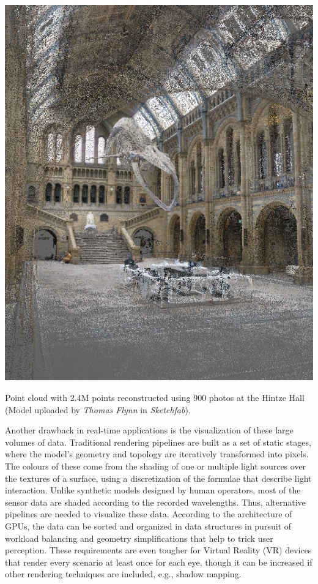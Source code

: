 \begin{marginfigure}[.5cm]
	\includegraphics{figs/introduction/hintze.png}
	\caption{Point cloud with 2.4M points reconstructed using 900 photos at the Hintze Hall (Model uploaded by \textit{Thomas Flynn} in \textit{Sketchfab}).  }
	\label{fig:hintze_hall}
\end{marginfigure}
Another drawback in real-time applications is the visualization of these large volumes of data. Traditional rendering pipelines are built as a set of static stages, where the model's geometry and topology are iteratively transformed into pixels. The colours of these come from the shading of one or multiple light sources over the textures of a surface, using a discretization of the formulae that describe light interaction. Unlike synthetic models designed by human operators, most of the sensor data are shaded according to the recorded wavelengths. Thus, alternative pipelines are needed to visualize these data. According to the architecture of GPUs, the data can be sorted and organized in data structures in pursuit of workload balancing and geometry simplifications that help to trick user perception. These requirements are even tougher for Virtual Reality (VR) devices that render every scenario at least once for each eye, though it can be increased if other rendering techniques are included, e.g., shadow mapping.  

